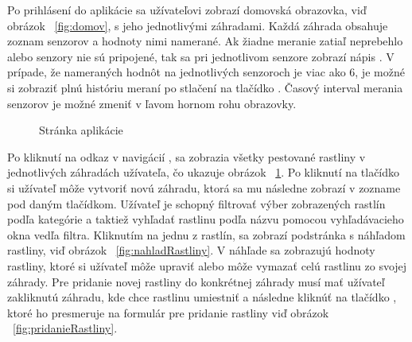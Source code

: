 \documentclass[twoside]{ctuthesis}
\theoremstyle{plain}
\theoremstyle{definition}
\theoremstyle{note}
\begin{document}
Po prihlásení do aplikácie sa užívateľovi zobrazí domovská obrazovka, viď obrázok ~\ref{fig:domov}, s jeho jednotlivými záhradami. Každá záhrada obsahuje zoznam senzorov a hodnoty nimi namerané. Ak žiadne meranie zatiaľ neprebehlo alebo senzory nie sú pripojené, tak sa pri jednotlivom senzore zobrazí nápis  \textit {}. V prípade, že nameraných hodnôt na jednotlivých senzoroch je viac ako 6, je možné si zobraziť plnú históriu meraní po stlačení na tlačídko  \textit {}. Časový interval merania senzorov je možné zmeniť v ľavom hornom rohu obrazovky.

\begin{figure}[H]
\caption{Stránka aplikácie  }
\label{fig:zahrada}
\end{figure}

Po kliknutí na odkaz v navigácií \textit {}, sa zobrazia všetky pestované rastliny v jednotlivých záhradách užívateľa, čo ukazuje obrázok ~\ref{fig:zahrada}. Po kliknutí na tlačídko \textit {} si užívateľ môže vytvoriť novú záhradu, ktorá sa mu následne zobrazí v zozname pod daným tlačídkom.
Užívateľ je schopný filtrovať výber zobrazených rastlín podľa kategórie a taktiež vyhľadať rastlinu podľa názvu pomocou vyhľadávacieho okna vedľa filtra. Kliknutím na jednu z rastlín, sa zobrazí podstránka s náhľadom rastliny, viď obrázok ~\ref{fig:nahladRastliny}. V náhľade sa zobrazujú hodnoty rastliny, ktoré si užívateľ môže upraviť alebo môže vymazať celú rastlinu zo svojej záhrady. Pre pridanie novej rastliny do konkrétnej záhrady musí mať užívateľ zakliknutú záhradu, kde chce rastlinu umiestniť a následne kliknúť na tlačídko  \textit {}, ktoré ho presmeruje na formulár pre pridanie rastliny viď obrázok ~\ref{fig:pridanieRastliny}.
\end{document}
